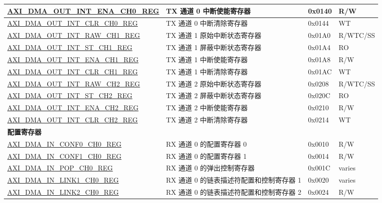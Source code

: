 \begin{longtable}{ | l | l | p{1.3cm} | l | }
\hyperref[regdesc:AXIDMAOUTINTENACHNREG]{AXI\_DMA\_OUT\_INT\_ENA\_CH0\_REG} & TX 通道 0 中断使能寄存器 & 0x0140 & R/W \\ \hline
\hyperref[regdesc:AXIDMAOUTINTCLRCHNREG]{AXI\_DMA\_OUT\_INT\_CLR\_CH0\_REG} & TX 通道 0 中断清除寄存器  & 0x0144 & WT \\ \hline
\hyperref[regdesc:AXIDMAOUTINTRAWCHNREG]{AXI\_DMA\_OUT\_INT\_RAW\_CH1\_REG} & TX 通道 1 原始中断状态寄存器 & 0x01A0 & R/WTC/SS \\ \hline
\hyperref[regdesc:AXIDMAOUTINTSTCHNREG]{AXI\_DMA\_OUT\_INT\_ST\_CH1\_REG} & TX 通道 1 屏蔽中断状态寄存器 & 0x01A4 & RO \\ \hline
\hyperref[regdesc:AXIDMAOUTINTENACHNREG]{AXI\_DMA\_OUT\_INT\_ENA\_CH1\_REG} & TX 通道 1 中断使能寄存器 & 0x01A8 & R/W \\ \hline
\hyperref[regdesc:AXIDMAOUTINTCLRCHNREG]{AXI\_DMA\_OUT\_INT\_CLR\_CH1\_REG} & TX 通道 1 中断清除寄存器  & 0x01AC & WT \\ \hline
\hyperref[regdesc:AXIDMAOUTINTRAWCHNREG]{AXI\_DMA\_OUT\_INT\_RAW\_CH2\_REG} & TX 通道 2 原始中断状态寄存器 & 0x0208 & R/WTC/SS \\ \hline
\hyperref[regdesc:AXIDMAOUTINTSTCHNREG]{AXI\_DMA\_OUT\_INT\_ST\_CH2\_REG} & TX 通道 2 屏蔽中断状态寄存器 & 0x020C & RO \\ \hline
\hyperref[regdesc:AXIDMAOUTINTENACHNREG]{AXI\_DMA\_OUT\_INT\_ENA\_CH2\_REG} & TX 通道 2 中断使能寄存器 & 0x0210 & R/W \\ \hline
\hyperref[regdesc:AXIDMAOUTINTCLRCHNREG]{AXI\_DMA\_OUT\_INT\_CLR\_CH2\_REG} & TX 通道 2 中断清除寄存器  & 0x0214 & WT \\ \hline
\multicolumn{4}{|l|}{\textbf{配置寄存器}} \\ \hline
\hyperref[regdesc:AXIDMAINCONF0CHNREG]{AXI\_DMA\_IN\_CONF0\_CH0\_REG} & RX 通道 0 的配置寄存器 0 & 0x0010 & R/W \\ \hline
\hyperref[regdesc:AXIDMAINCONF1CHNREG]{AXI\_DMA\_IN\_CONF1\_CH0\_REG} & RX 通道 0 的配置寄存器 1 & 0x0014 & R/W \\ \hline
\hyperref[regdesc:AXIDMAINPOPCHNREG]{AXI\_DMA\_IN\_POP\_CH0\_REG} & RX 通道 0 的弹出控制寄存器 & 0x001C & varies \\ \hline
\hyperref[regdesc:AXIDMAINLINK1CHNREG]{AXI\_DMA\_IN\_LINK1\_CH0\_REG} & RX 通道 0 的链表描述符配置和控制寄存器 1 & 0x0020 & varies \\ \hline
\hyperref[regdesc:AXIDMAINLINK2CHNREG]{AXI\_DMA\_IN\_LINK2\_CH0\_REG} & RX 通道 0 的链表描述符配置和控制寄存器 2 & 0x0024 & R/W \\ \hline

\end{longtable}
